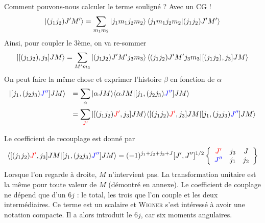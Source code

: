 Comment pouvons-nous calculer le terme souligné ? Avec un CG !
\begin{equation}
\ket{(j_1j_2)J'M'} = \sum_{m_1m_2} \ket{j_1m_1j_2m_2}\bra{j_1m_1j_2m_2}\ket{(j_1j_2)J'M'}
\end{equation}
Ainsi, pour coupler le 3ème, on va re-sommer
\begin{equation}
\ket{[(j_1j_2),j_3]JM} = \sum_{M'm_3}\ket{(j_1j_2)J'M'j_3m_3}\bra{(j_1j_2)J'M'j_3m_3}
\ket{[(j_1j_2),j_3]JM}
\end{equation}
On peut faire la même chose et exprimer l'histoire $\beta$ en fonction de $\alpha$
\begin{equation}
\begin{array}{ll}
  \vert [ j_1, (j_2 j_3) {\color{blue} J''}]  J M \rangle 
&=\DS
\sum_{\alpha} \vert \alpha JM \rangle \langle \alpha JM
\vert [ j_1, (j_2 j_3) {\color{blue} J''}]  J M \rangle\vspace{2mm}\\
&\DS=
\sum_{{\color{red} J'}} \vert [ (j_1 j_2) {\color{red} J'}, j_3 ]
JM \rangle \langle [ (j_1 j_2) {\color{red} J'}, j_3 ] JM
\vert [ j_1, (j_2 j_3) {\color{blue} J''}]  J M \rangle
\end{array}
\end{equation}

Le coefficient de recouplage est donné par
\begin{equation}
\langle [ (j_1 j_2) {\color{red} J'}, j_3 ] JM
\vert [ j_1, (j_2 j_3) {\color{blue} J''}]  J M \rangle =
(-1)^{j_1 + j_2 + j_3 + J} [J',J'']^{1/2}
\left\{
\begin{array}{ccc}
{\color{red} J'}  &  j_3   &   J \\
{\color{blue} J''} &  j_1  & j_2  \end{array}  \right\}
\end{equation}
Lorsque l'on regarde à droite, $M$ n'intervient pas. La transformation unitaire est 
la même pour toute valeur de $M$ (démontré en annexe). Le coefficient de couplage ne dépend 
que d'un $6j$ : le total, les trois que l'on couple et les deux intermédiaires. Ce terme est un scalaire et \textsc{Wigner} 
s'est intéressé à avoir une notation compacte. Il a alors introduit le $6j$, car six moments
angulaires.\\

